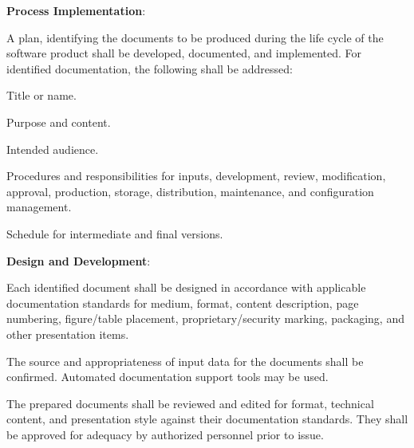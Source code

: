 			\begin{adjustwidth}{2em}{0pt} 

				\begin{compactenum}

					\item {\bf Process Implementation}:
					\begin{compactenum}

						\item A plan, identifying the documents to be produced during the life cycle of the software product shall be developed, documented, and implemented. For identified documentation, the following shall be addressed:

						\begin{compactenum}

							\item Title or name.

							\item Purpose and content.

							\item Intended audience.

							\item Procedures and responsibilities for inputs, development, review, modification, approval, production,
							storage, distribution, maintenance, and configuration management.

							\item Schedule for intermediate and final versions.

						\end{compactenum}

					\end{compactenum}

					\item {\bf Design and Development}:
					\begin{compactenum}

						\item Each identified document shall be designed in accordance with applicable documentation standards for medium, format, content description, page numbering, figure/table placement, proprietary/security marking, packaging, and other presentation items.

						\item The source and appropriateness of input data for the documents shall be confirmed. Automated documentation support tools may be used.

						\item The prepared documents shall be reviewed and edited for format, technical content, and presentation style against their documentation standards. They shall be approved for adequacy by authorized personnel prior to issue.


\end{compactenum}
\end{compactenum}
\end{adjustwidth}
